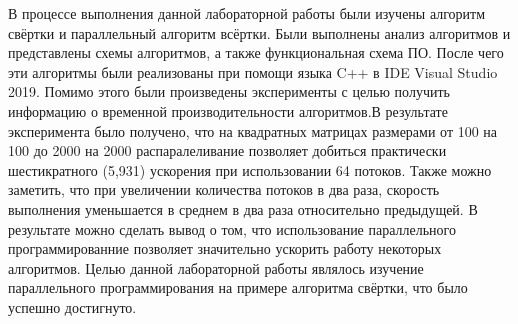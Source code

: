 \Conclusion
В процессе выполнения данной лабораторной работы были изучены алгоритм свёртки и параллельный алгоритм всёртки. Были выполнены анализ алгоритмов и представлены схемы алгоритмов, а также функциональная схема ПО. После чего эти алгоритмы были реализованы при помощи языка C++ в IDE Visual Studio 2019. Помимо этого были произведены эксперименты с целью получить информацию о временной производительности алгоритмов.В результате эксперимента было получено, что на квадратных матрицах размерами от 100 на 100 до 2000 на 2000 распаралеливание позволяет добиться практически шестикратного (5,931) ускорения при использовании 64 потоков. Также можно заметить, что при увеличении количества потоков в два раза, скорость выполнения уменьшается в среднем в два раза относительно предыдущей. В результате можно сделать вывод о том, что использование параллельного программированние позволяет значительно ускорить работу некоторых алгоритмов. Целью данной лабораторной работы являлось изучение параллельного программирования на примере алгоритма свёртки, что было успешно достигнуто.